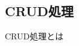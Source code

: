 \documentclass[../../../main]{subfiles}
\begin{document}
    \subsection{CRUD処理}\label{subsec:phraseology-crud}

    CRUD処理とは
\end{document}

